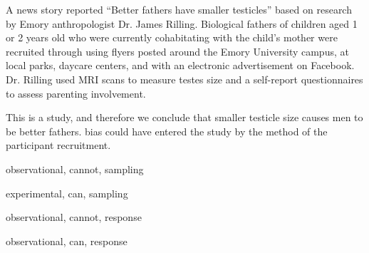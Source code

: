 \begin{frame}
\small{A news story reported ``Better fathers have smaller testicles'' based on research by Emory anthropologist Dr. James Rilling.  Biological fathers of children aged 1 or 2 years old who were currently cohabitating with the child's mother were recruited through using flyers posted around the Emory University campus, at local parks, daycare centers, and with an electronic advertisement on Facebook.  Dr. Rilling used MRI scans to measure testes size and a self-report questionnaires to assess parenting involvement.}
\begin{clicker}{\small{This is a \underline{\hspace{0.5in}} study, and therefore we \underline{\hspace{0.5in}} conclude that smaller testicle size causes men to be better fathers.  \underline{\hspace{0.5in}} bias could have entered the study by the method of the participant recruitment.}}
\begin{enumerate}
    \small{
    \item
    observational, cannot, sampling
    \item
    experimental, can, sampling
    \item
    observational, cannot, response
    \item
    observational, can, response}
\end{enumerate}
\end{clicker}
\end{frame}

%


